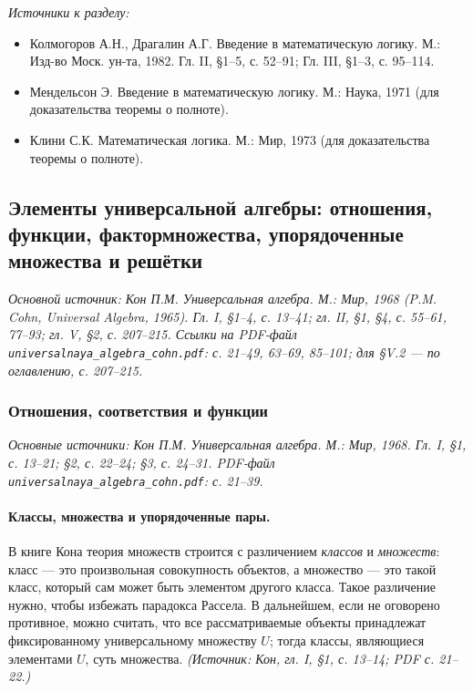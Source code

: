 \documentclass[a4paper,12pt]{article}
\begin{document}
\noindent\textit{Источники к разделу:}
\begin{itemize}
\item Колмогоров А.Н., Драгалин А.Г. Введение в математическую логику. М.: Изд-во Моск. ун-та, 1982. Гл. II, §1--5, с. 52--91; Гл. III, §1--3, с. 95--114.
\item Мендельсон Э. Введение в математическую логику. М.: Наука, 1971 (для доказательства теоремы о полноте).
\item Клини С.К. Математическая логика. М.: Мир, 1973 (для доказательства теоремы о полноте).
\end{itemize}

\subsection{Элементы универсальной алгебры: отношения, функции, фактормножества, упорядоченные множества и решётки}

\noindent\textit{Основной источник: Кон П.М. Универсальная алгебра. М.: Мир, 1968 (P.M. Cohn, Universal Algebra, 1965). Гл. I, §1--4, с. 13--41; гл. II, §1, §4, с. 55--61, 77--93; гл. V, §2, с. 207--215. Ссылки на PDF-файл \texttt{universalnaya\_algebra\_cohn.pdf}: с. 21--49, 63--69, 85--101; для §V.2 — по оглавлению, с. 207--215.}

\subsubsection{Отношения, соответствия и функции}

\noindent\textit{Основные источники: Кон П.М. Универсальная алгебра. М.: Мир, 1968. Гл. I, §1, с. 13--21; §2, с. 22--24; §3, с. 24--31. PDF-файл \texttt{universalnaya\_algebra\_cohn.pdf}: с. 21--39.}

\paragraph{Классы, множества и упорядоченные пары.}
В книге Кона теория множеств строится с различением \emph{классов} и \emph{множеств}: класс — это произвольная совокупность объектов, а множество — это такой класс, который сам может быть элементом другого класса. Такое различение нужно, чтобы избежать парадокса Рассела. В дальнейшем, если не оговорено противное, можно считать, что все рассматриваемые объекты принадлежат фиксированному универсальному множеству \(U\); тогда классы, являющиеся элементами \(U\), суть множества.
\textit{(Источник: Кон, гл. I, §1, с. 13--14; PDF с. 21--22.)}
\end{document}
